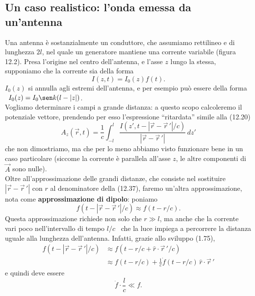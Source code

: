 \subsection{Un caso realistico: l'onda emessa da un'antenna}

Una antenna \`e sostanzialmente un conduttore, che assumiamo rettilineo e di
lunghezza $2l$, nel quale un generatore mantiene una corrente variabile (figura
12.2). Presa l'origine nel centro dell'antenna, e l'asse $z$ lungo la stessa,
supponiamo che la corrente sia della forma
\begin{equation}
  I(z,t)=I_0(z)f(t).
  \tag{12.36}
\end{equation}
$I_0(z)$ si annulla agli estremi dell'antenna, e per esempio pu\`o essere della
forma \ $I_0(z)=I_0\sen k(l-|z|)$.\\
Vogliamo determinare i campi a grande distanza: a questo scopo calcoleremo il
potenziale vettore, prendendo per esso l'espressione ``ritardata'' simile alla
(12.20)
\begin{equation}
  A_z(\vec r,t)=\frac{1}{c}\int_{-l}^l\frac{I(z',t-|\vec r-\vec r\,'|/c)}
  {|\vec r-\vec r\,'|}\,dz'
  \tag{12.37}
\end{equation}
che non dimostriamo, ma che per lo meno abbiamo visto funzionare bene in un caso
particolare (siccome la corrente \`e parallela all'asse $z$, le altre componenti
di $\vec A$ sono nulle).\\
Oltre all'approssimazione delle grandi distanze, che consiste nel sostituire
$|\vec r-\vec r\,'|$ con
$r$ al denominatore della (12.37), faremo un'altra approssimazione, nota come
\textbf{approssimazione di dipolo}: poniamo
\begin{equation}
  f(t-|\vec r-\vec r\,'|/c)\approx f(t-r/c).
  \tag{12.38}
\end{equation}
Questa approssimazione richiede non solo che $r\gg l$, ma anche che la corrente
vari poco nell'intervallo di tempo $l/c$ \ che la luce impiega a percorrere la
distanza uguale alla lunghezza dell'antenna. Infatti, grazie allo sviluppo
(1.75),
\begin{equation}
  \begin{aligned}
    f(t-|\vec r-\vec r\,'|/c)&\approx f(t-r/c+\hat r\cdot\vec r\,'/c)\\
    &\approx f(t-r/c)+\frac{1}{c}\dot f(t-r/c)\,\hat r\cdot\vec r\,'
  \end{aligned}
  \tag{12.39}
\end{equation}
e quindi deve essere
\begin{equation}
  \dot f\cdot\frac{l}{c}\ll f.
  \tag{12.40}
\end{equation}
